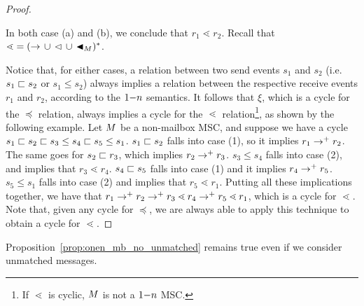\begin{proof}
\begin{enumerate}
\begin{enumerate}
	\end{enumerate}
	In both case (a) and (b), we conclude that $r_1 \lessdot r_2$. Recall that ${\lessdot} = ({\to} \,\cup\, {\lhd} \,\cup\, {\blacktriangleleft_M})^\ast$.
\end{enumerate}
Notice that, for either cases, a relation between two send events $s_1$ and $s_2$ (i.e. $s_1 \sqsubset s_2$ or $s_1 \le s_2$) always implies a relation between the respective receive events $r_1$ and $r_2$, according to the $1\mathsf{-}n$ semantics. It follows that $\xi$, which is a cycle for the $\preceq$ relation, always implies a cycle for the $\lessdot$ relation\footnote{If $\lessdot$ is cyclic, $M$ is not a $1\mathsf{-}n$ MSC.}, as shown by the following example. Let $M$ be a non-mailbox MSC, and suppose we have a cycle $s_1 \sqsubset s_2 \sqsubset s_3 \le s_4 \sqsubset s_5 \le s_1$. $s_1 \sqsubset s_2$ falls into case (1), so it implies $r_1 \to^+ r_2$. The same goes for $s_2 \sqsubset r_3$, which implies $r_2 \to^+ r_3$. $s_3 \le s_4$ falls into case (2), and implies that $r_3 \lessdot r_4$. $s_4 \sqsubset s_5$ falls into case (1) and it implies $r_4 \to^+ r_5$. $s_5 \le s_1$ falls into case (2) and implies that $r_5 \lessdot r_1$. Putting all these implications together, we have that $r_1 \to^+ r_2 \to^+ r_3 \lessdot r_4 \to^+ r_5 \lessdot r_1$, which is a cycle for $\lessdot$. Note that, given any cycle for $\preceq$, we are always able to apply this technique to obtain a cycle for $\lessdot$.
\end{proof}

Proposition~\ref{prop:onen_mb_no_unmatched} remains true even if we consider unmatched messages.

